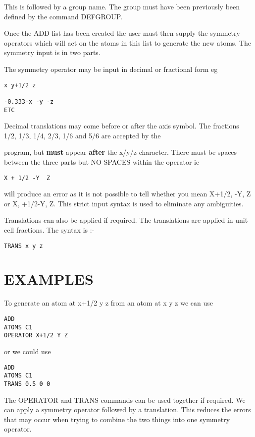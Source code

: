 \documentclass[10pt,a4paper]{report}
\begin{document}
\bigskip{}


This is followed by a group name. The group must have been
previously been defined by the command DEFGROUP.





Once the ADD list has been created the user must then supply
the
symmetry operators which will act on the atoms in this list to
generate
the new atoms. The symmetry input is in two parts.


\bigskip{}
The symmetry operator may be input in decimal or fractional form eg
\small\begin{verbatim}
x y+1/2 z

-0.333-x -y -z
ETC
\end{verbatim}\normalsize


Decimal translations may  come before or after the axis symbol.
The fractions 1/2, 1/3, 1/4, 2/3, 1/6 and 5/6 are accepted by the

program, but {\bf must} appear {\bf after} the
x/y/z
character. There must be spaces between the three parts but NO
SPACES
within the operator ie
\small\begin{verbatim}
X + 1/2 -Y  Z
\end{verbatim}\normalsize


will produce an error as it is not possible to tell whether you
mean
X+1/2, -Y, Z or X, +1/2-Y, Z. This strict input syntax is used
to eliminate
any ambiguities.


\bigskip{}
Translations can also be applied if required. The translations
are
applied in unit cell fractions. The syntax is :-
\small\begin{verbatim}
TRANS x y z
\end{verbatim}\normalsize


\section{EXAMPLES}
To generate an atom at x+1/2 y z from an atom at x y z we can use
\small\begin{verbatim}
ADD
ATOMS C1
OPERATOR X+1/2 Y Z
\end{verbatim}\normalsize


or we could use
\small\begin{verbatim}
ADD
ATOMS C1
TRANS 0.5 0 0
\end{verbatim}\normalsize


The OPERATOR and TRANS commands can be used together if required.
We can
apply a symmetry operator followed by a translation. This reduces
the
errors that may occur when trying to combine the two things into
one
symmetry operator.
\end{document}
